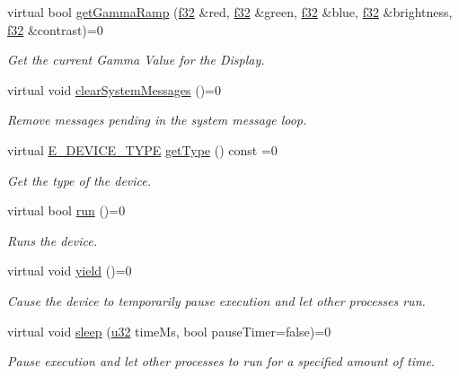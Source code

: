 \begin{DoxyCompactItemize}
virtual bool \hyperlink{classirr_1_1IrrlichtDevice_a30c4e1716271600a88e0ca07ca030f9b}{get\+Gamma\+Ramp} (\hyperlink{namespaceirr_a0277be98d67dc26ff93b1a6a1d086b07}{f32} \&red, \hyperlink{namespaceirr_a0277be98d67dc26ff93b1a6a1d086b07}{f32} \&green, \hyperlink{namespaceirr_a0277be98d67dc26ff93b1a6a1d086b07}{f32} \&blue, \hyperlink{namespaceirr_a0277be98d67dc26ff93b1a6a1d086b07}{f32} \&brightness, \hyperlink{namespaceirr_a0277be98d67dc26ff93b1a6a1d086b07}{f32} \&contrast)=0
\begin{DoxyCompactList}\small\item\em Get the current Gamma Value for the Display. \end{DoxyCompactList}\item 
virtual void \hyperlink{classirr_1_1IrrlichtDevice_aa10c6151a267d8a1500d5dc7b44425dd}{clear\+System\+Messages} ()=0
\begin{DoxyCompactList}\small\item\em Remove messages pending in the system message loop. \end{DoxyCompactList}\item 
virtual \hyperlink{namespaceirr_ac25d94cf2e1037c7ca18ee79b3bd4505}{E\+\_\+\+D\+E\+V\+I\+C\+E\+\_\+\+T\+Y\+PE} \hyperlink{classirr_1_1IrrlichtDevice_a2a2ec439b1f153169003c4d3e986a7d7}{get\+Type} () const =0
\begin{DoxyCompactList}\small\item\em Get the type of the device. \end{DoxyCompactList}\item 
virtual bool \hyperlink{classirr_1_1IrrlichtDevice_a0489f8151dc43f6f41503ffb5a160b35}{run} ()=0
\begin{DoxyCompactList}\small\item\em Runs the device. \end{DoxyCompactList}\item 
virtual void \hyperlink{classirr_1_1IrrlichtDevice_a731727774fad9fc4c6c1c85277ca36dc}{yield} ()=0
\begin{DoxyCompactList}\small\item\em Cause the device to temporarily pause execution and let other processes run. \end{DoxyCompactList}\item 
virtual void \hyperlink{classirr_1_1IrrlichtDevice_a89a3ecebc0e7c5ae08617b78a6e8a9f7}{sleep} (\hyperlink{namespaceirr_a0416a53257075833e7002efd0a18e804}{u32} time\+Ms, bool pause\+Timer=false)=0
\begin{DoxyCompactList}\small\item\em Pause execution and let other processes to run for a specified amount of time. \end{DoxyCompactList}\item 

\end{DoxyCompactItemize}
